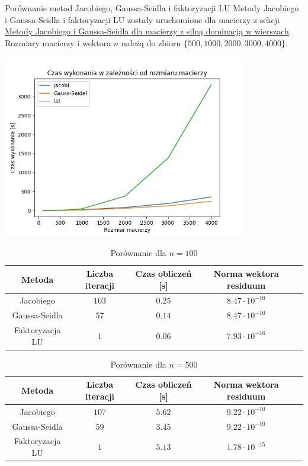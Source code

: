 \documentclass{article}
\begin{document}
\begin{section}{Porównanie metod Jacobiego, Gaussa-Seidla i faktoryzacji LU}
    Metody Jacobiego i Gaussa-Seidla i faktoryzacji LU zostały uruchomione dla macierzy z sekcji 
    \hyperref[sec:1]{Metody Jacobiego i Gaussa-Seidla dla macierzy z silną dominacją w wierszach}.
    Rozmiary macierzy i wektora $n$ należą do zbioru $\{500, 1000, 2000, 3000, 4000\}$.

    \begin{center}
        \includegraphics[width=0.8\textwidth]{czas_wykonania.png}
    \end{center}

    \begin{table}
        \centering
        \begin{tabular}{|c|c|c|c|c|}
            \hline
            Metoda & Liczba iteracji & Czas obliczeń [s] & Norma wektora residuum \\
            \hline
            Jacobiego & $103$ & $0.25$ & $8.47\cdot10^{-10}$ \\
            Gaussa-Seidla & $57$ & $0.14$ & $8.47\cdot10^{-10}$ \\
            Faktoryzacja LU & $1$ & $0.06$ & $7.93\cdot10^{-16}$ \\
            \hline
        \end{tabular}
        \caption{Porównanie dla $n = 100$}
    \end{table}

    \begin{table}
        \centering
        \begin{tabular}{|c|c|c|c|c|}
            \hline
            Metoda & Liczba iteracji & Czas obliczeń [s] & Norma wektora residuum \\
            \hline
            Jacobiego & $107$ & $5.62$ & $9.22\cdot10^{-10}$ \\
            Gaussa-Seidla & $59$ & $3.45$ & $9.22\cdot10^{-10}$ \\
            Faktoryzacja LU & $1$ & $5.13$ & $1.78\cdot10^{-15}$ \\
            \hline
        \end{tabular}
        \caption{Porównanie dla $n = 500$}
    \end{table}


\end{section}
\end{document}
